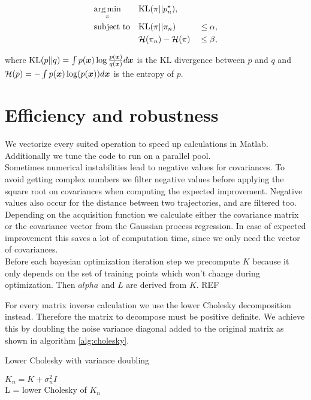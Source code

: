 \begin{align}
    & \underset{\pi}{\arg\min} & & \mathrm{KL}(\pi||p_n^\star),& &\notag\\
    & \text{subject to}
    & & \mathrm{KL}(\pi||\pi_n) & &\leq \alpha,\label{eq:kl:our}\\
    & & &{\cal H}(\pi_n) - {\cal H}(\pi) & &\leq \beta,\label{eq:entropy:our}
\end{align}

where $\mathrm{KL}(p||q) = \int p({\boldsymbol{x}}) \log \frac{p({\boldsymbol{x}})}{q({\boldsymbol{x}})} d{\boldsymbol{x}}$ is the KL divergence between $p$ and $q$ and ${\cal H}(p) = -\int p({\boldsymbol{x}})\log(p({\boldsymbol{x}})) d{\boldsymbol{x}}$ is the entropy of $p$.

\section{Efficiency and robustness}
We vectorize every suited operation to speed up calculations in Matlab. Additionally we tune the code to run on a parallel pool.\\

Sometimes numerical instabilities lead to negative values for covariances. To avoid getting complex numbers we filter negative values before applying the square root on covariances when computing the expected improvement. Negative values also occur for the distance between two trajectories, and are filtered too.\\

Depending on the acquisition function we calculate either the covariance matrix or the covariance vector from the Gaussian process regression. In case of expected improvement this saves a lot of computation time, since we only need the vector of covariances.\\

Before each bayesian optimization iteration step we precompute $K$ because it only depends on the set of training points which won't change during optimization. Then $alpha$ and $L$ are derived from $K$. REF

For every matrix inverse calculation we use the lower Cholesky decomposition instead. Therefore the matrix to decompose must be positive definite. We achieve this by doubling the noise variance diagonal added to the original matrix as shown in algorithm \ref{alg:cholesky}.

\begin{algorithm}
    \caption{Lower Cholesky with variance doubling\label{alg:cholesky}}
    \BlankLine
    $K_n = K+\sigma_n^2 I$\\
    L = lower Cholesky of $K_n$\\
\end{algorithm}


